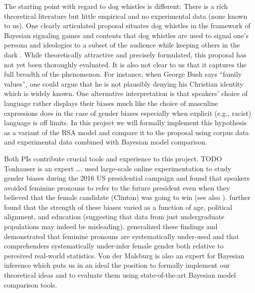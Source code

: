 \documentclass[11pt]{article}
\begin{document}
The starting point with regard to dog whistles is different: There is a rich theoretical literature but little empirical and no experimental data (none known to us).  One clearly articulated proposal situates dog whistles in the framework of Bayesian signaling games \parencite{Burnett2017} and contents that dog whistles are used to signal one’s persona and ideologies to a subset of the audience while keeping others in the dark \parencite{HendersonMcCready2018, HendersonMcCready2019}.  While theoretically attractive and precisely formulated, this proposal has not yet been thoroughly evaluated.  It is also not clear to us that it captures the full breadth of the phenomenon.  For instance, when George Bush says “family values”, one could argue that he is not plausibly denying his Christian identity which is widely known.  One alternative interpretation is that speakers’ choice of language rather displays their biases much like the choice of masculine expressions does in the case of gender biases especially when explicit (e.g., racist) language is off limits.  In this project we will formally implement this hypothesis as a variant of the RSA model and compare it to the \citeauthor{HendersonMcCready2019} proposal using corpus data and experimental data combined with Bayesian model comparison.

Both PIs contribute crucial tools and experience to this project.  TODO Tonhauser is an expert …. \textcite{MalsburgEtAl2020} used large-scale online experimentation to study gender biases during the 2016 US presidential campaign and found that speakers avoided feminine pronouns to refer to the future president even when they believed that the female candidate (Clinton) was going to win (see also \cite{PozniakBurnett2021, PoppelsEtAl2021CUNY}).  \Textcite{MalsburgEtAl2020} further found that the strength of these biases varied as a function of age, political alignment, and education (suggesting that data from just undergraduate populations may indeed be misleading).  \textcite{BoyceEtAl2019LSA} generalized these findings and demonstrated that feminine pronouns are systematically under-used and that comprehenders systematically under-infer female gender both relative to perceived real-world statistics.  Von der Malsburg is also an expert for Bayesian inference \parencite[see, e.g,]{MorganEtAl2020, MeziereEtAl2021} which puts us in an ideal the position to formally implement our theoretical ideas and to evaluate them using state-of-the-art Bayesian model comparison tools.


%
\end{document}
